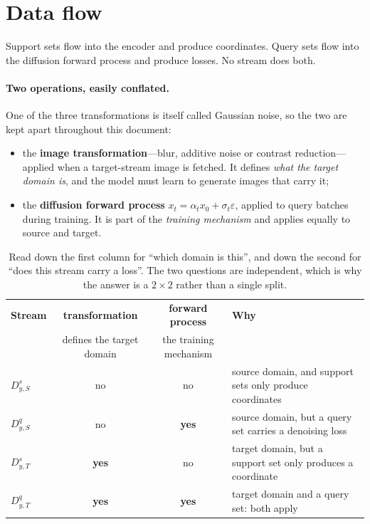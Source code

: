 \documentclass[11pt]{article}
\newcommand{\Dss}{D^{s}_{y,S}}
\newcommand{\Dqs}{D^{q}_{y,S}}
\newcommand{\Dst}{D^{s}_{y,T}}
\newcommand{\Dqt}{D^{q}_{y,T}}
\begin{document}
\section{Data flow}
\label{sec:flow}

Support sets flow into the encoder and produce coordinates. Query sets flow into the diffusion
forward process and produce losses. No stream does both.

\paragraph{Two operations, easily conflated.}
One of the three transformations is itself called Gaussian noise, so the two are kept apart
throughout this document:

\begin{itemize}[leftmargin=*, itemsep=2pt]
\item the \textbf{image transformation}---blur, additive noise or contrast reduction---applied
      when a target-stream image is fetched. It defines \emph{what the target domain is}, and the
      model must learn to generate images that carry it;
\item the \textbf{diffusion forward process} $x_t=\alpha_t x_0+\sigma_t\varepsilon$, applied to
      query batches during training. It is part of the \emph{training mechanism} and applies
      equally to source and target.
\end{itemize}

\begin{table}[htbp]
\centering\small
\begin{tabular}{@{}lccp{6.4cm}@{}}
\toprule
\textbf{Stream} & \textbf{transformation} & \textbf{forward process} & \textbf{Why} \\
 & \scriptsize defines the target domain & \scriptsize the training mechanism & \\
\midrule
$\Dss$ & no  & no  & source domain, and support sets only produce coordinates \\
$\Dqs$ & no  & \textbf{yes} & source domain, but a query set carries a denoising loss \\
$\Dst$ & \textbf{yes} & no  & target domain, but a support set only produces a coordinate \\
$\Dqt$ & \textbf{yes} & \textbf{yes} & target domain and a query set: both apply \\
\bottomrule
\end{tabular}
\caption{Read down the first column for ``which domain is this'', and down the second for ``does
this stream carry a loss''. The two questions are independent, which is why the answer is a
$2\times2$ rather than a single split.}
\end{table}
\end{document}
